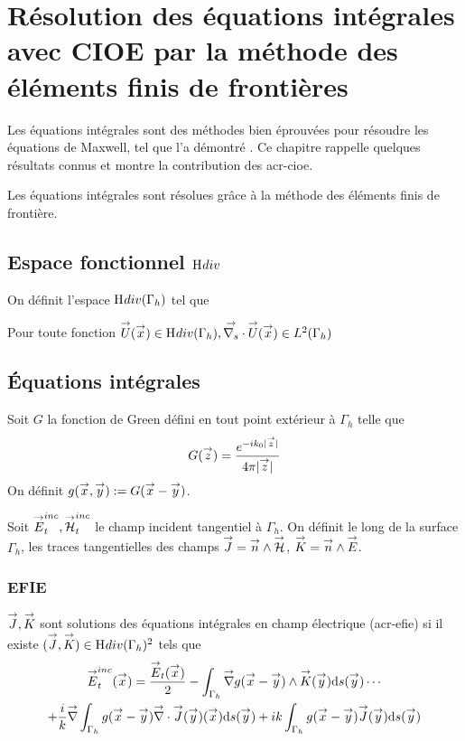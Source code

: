 \section{Résolution des équations intégrales avec CIOE par la méthode des éléments finis de frontières}

  Les équations intégrales sont des méthodes bien éprouvées pour résoudre les équations de Maxwell, tel que l'a démontré \cite{nedelec_acoustic_2001}. Ce chapitre rappelle quelques résultats connus et montre la contribution des \gls{acr-cioe}.

  Les équations intégrales sont résolues grâce à la méthode des éléments finis de frontière.

  \subsection[Espace fonctionnel Hdiv]{Espace fonctionnel \(\mathrm{H}_\mathrm{{}}{div}\)}
    On définit l'espace \(\mathrm{H}_\mathrm{{}}{div}(\Gamma_h)\) tel que
    \begin{defn}
      Pour toute fonction \({\overset{\rightarrow}{U}}({\overset{\rightarrow}{x}}) \in \mathrm{H}_\mathrm{{}}{div}(\Gamma_h), {\overset{\rightarrow}{\nabla_s}} \cdot{\overset{\rightarrow}{U}}({\overset{\rightarrow}{x}}) \in L^2(\Gamma_h)\)
    \end{defn}

  \subsection{Équations intégrales}

      Soit \(G\) la fonction de Green défini en tout point extérieur à \(\Gamma_h\) telle que
      \begin{equation}
        G({\overset{\rightarrow}{z}}) = \dfrac{e^{-ik_0|{\overset{\rightarrow}{z}}|}}{4\pi|{\overset{\rightarrow}{z}}|}
      \end{equation}
      On définit \(g({\overset{\rightarrow}{x}},{\overset{\rightarrow}{y}}) := G({\overset{\rightarrow}{x}} - {\overset{\rightarrow}{y}})\).

      Soit \({\overset{\rightarrow}{E}}^{inc}_t,{\overset{\rightarrow}{\mathcal{H}}}^{inc}_t\) le champ incident tangentiel à \(\Gamma_h\). On définit le long de la surface \(\Gamma_h\), les traces tangentielles des champs \({\overset{\rightarrow}{J}} = {\overset{\rightarrow}{n}} \wedge {\overset{\rightarrow}{\mathcal{H}}}\), \({\overset{\rightarrow}{K}} = {\overset{\rightarrow}{n}} \wedge {\overset{\rightarrow}{E}}\).

      \subsubsection{EFIE}

        \begin{defn}
          \({\overset{\rightarrow}{J}},{\overset{\rightarrow}{K}}\) sont solutions des équations intégrales en champ électrique (\gls{acr-efie}) si il existe \(({\overset{\rightarrow}{J}},{\overset{\rightarrow}{K}}) \in \mathrm{H}_\mathrm{{}}{div}(\Gamma_h)^2\) tels que
          \begin{multline}
            \label{eq:form_int:EFIE}
            \vE^{inc}_t(\vx) =
              \frac{\vE_t(\vx)}{2}
                - \int_{\Gamma_h} \vgrad g(\vx - \vy) \pvect \vK(\vy) \dd{s}(\vy) \cdots \\
              + \frac{i}{k}\vgrad \int_{\Gamma_h}  g(\vx - \vy)\vdiv\vJ(\vy)(\vx) \dd{s}(\vy)
                +  ik\int_{\Gamma_h} g(\vx - \vy)\vJ(\vy) \dd{s}(\vy)
          \end{multline}
        \end{defn}

